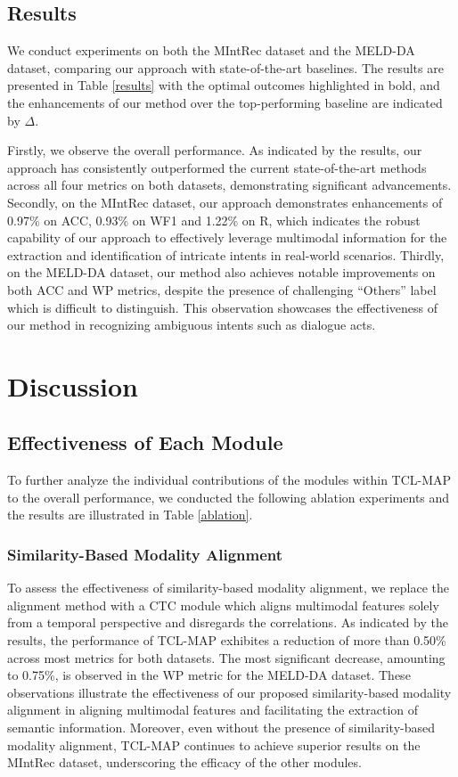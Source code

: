 \documentclass[letterpaper]{article} %
\begin{document}
\subsection{Results}
We conduct experiments on both the MIntRec dataset and the MELD-DA dataset, comparing our approach with state-of-the-art baselines. The results are presented in Table \ref{results} with the optimal outcomes highlighted in bold, and the enhancements of our method over the top-performing baseline are indicated by $\Delta$.

Firstly, we observe the overall performance. As indicated by the results, our approach has consistently outperformed the current state-of-the-art methods across all four metrics on both datasets, demonstrating significant advancements. Secondly, on the MIntRec dataset, our approach demonstrates enhancements of 0.97\% on ACC, 0.93\% on WF1 and 1.22\% on R, which indicates the robust capability of our approach to effectively leverage multimodal information for the extraction and identification of intricate intents in real-world scenarios. Thirdly, on the MELD-DA dataset, our method also achieves notable improvements on both ACC and WP metrics, despite the presence of challenging ``Others'' label which is difficult to distinguish. This observation showcases the effectiveness of our method in recognizing ambiguous intents such as dialogue acts.

\section{Discussion}
\subsection{Effectiveness of Each Module}
To further analyze the individual contributions of the modules within TCL-MAP to the overall performance, we conducted the following ablation experiments and the results are illustrated in Table \ref{ablation}.


\subsubsection{Similarity-Based Modality Alignment}
To assess the effectiveness of similarity-based modality alignment, we replace the alignment method with a CTC module \cite{10.1145/1143844.1143891} which aligns multimodal features solely from a temporal perspective and disregards the correlations. As indicated by the results, the performance of TCL-MAP exhibites a reduction of more than 0.50\% across most metrics for both datasets. The most significant decrease, amounting to 0.75\%, is observed in the WP metric for the MELD-DA dataset. These observations illustrate the effectiveness of our proposed similarity-based modality alignment in aligning multimodal features and facilitating the extraction of semantic information. Moreover, even without the presence of similarity-based modality alignment, TCL-MAP continues to achieve superior results on the MIntRec dataset, underscoring the efficacy of the other modules.
\end{document}
